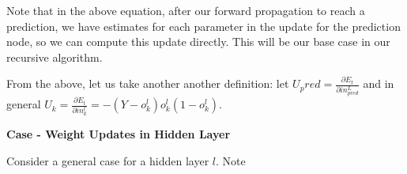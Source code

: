 \documentclass[11pt]{article}
\begin{document}
\vspace{5 mm}
\noindent
Note that in the above equation, after our forward propagation to reach a 
prediction, we have estimates for each parameter in the update for the 
prediction node, so we can compute this update directly. This will be our 
base case in our recursive algorithm.

\vspace{5 mm}
\noindent
From the above, let us take another another definition: let $U_pred = 
\frac{\partial E_{t}}{\partial in_{pred}^{L}}$ and in general 
$U_k = \frac{\partial E_{t}}{\partial in_{k}^{l}} = 
- (Y - o_{k}^{l}) o_{k}^{l} (1 - o_{k}^{l})$.

\vspace{5 mm}
\noindent
\textbf{Case - Weight Updates in Hidden Layer}

\vspace{5 mm}
\noindent
Consider a general case for a hidden layer $l$. Note
\end{document}
